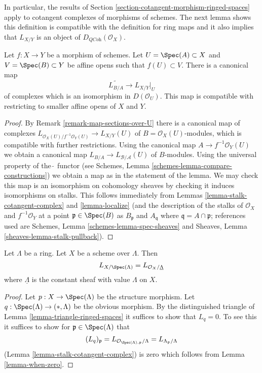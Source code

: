 \noindent
In particular, the results of
Section \ref{section-cotangent-morphism-ringed-spaces} apply
to cotangent complexes of morphisms of schemes.
The next lemma shows this definition is compatible with the definition
for ring maps and it also implies that $L_{X/Y}$ is an
object of $D_{\textit{QCoh}}(\mathcal{O}_X)$.

\begin{lemma}
\label{lemma-morphism-affine-schemes}
Let $f : X \to Y$ be a morphism of schemes. Let $U = \Spec(A) \subset X$
and $V = \Spec(B) \subset Y$ be affine opens such that $f(U) \subset V$.
There is a canonical map
$$
\widetilde{L_{B/A}} \longrightarrow L_{X/Y}|_U
$$
of complexes which is an isomorphism in $D(\mathcal{O}_U)$.
This map is compatible with restricting to smaller affine opens
of $X$ and $Y$.
\end{lemma}

\begin{proof}
By Remark \ref{remark-map-sections-over-U}
there is a canonical map of complexes
$L_{\mathcal{O}_X(U)/f^{-1}\mathcal{O}_Y(U)} \to L_{X/Y}(U)$
of $B = \mathcal{O}_X(U)$-modules, which is compatible
with further restrictions. Using the canonical map
$A \to f^{-1}\mathcal{O}_Y(U)$ we obtain a canonical map
$L_{B/A} \to L_{\mathcal{B}/\mathcal{A}}(U)$
of $B$-modules. Using the universal property of the $\widetilde{\ }$
functor (see Schemes, Lemma \ref{schemes-lemma-compare-constructions})
we obtain a map as in the statement of the lemma.
We may check this map is an isomorphism on cohomology sheaves
by checking it induces isomorphisms on stalks.
This follows immediately from
Lemmas \ref{lemma-stalk-cotangent-complex} and \ref{lemma-localize}
(and the description of the stalks of
$\mathcal{O}_X$ and $f^{-1}\mathcal{O}_Y$
at a point $\mathfrak p \in \Spec(B)$ as $B_\mathfrak p$ and
$A_\mathfrak q$ where $\mathfrak q = A \cap \mathfrak p$; references
used are Schemes, Lemma \ref{schemes-lemma-spec-sheaves}
and
Sheaves, Lemma \ref{sheaves-lemma-stalk-pullback}).
\end{proof}

\begin{lemma}
\label{lemma-scheme-over-ring}
Let $\Lambda$ be a ring. Let $X$ be a scheme over $\Lambda$.
Then
$$
L_{X/\Spec(\Lambda)} = L_{\mathcal{O}_X/\underline{\Lambda}}
$$
where $\underline{\Lambda}$ is the constant sheaf with value
$\Lambda$ on $X$.
\end{lemma}

\begin{proof}
Let $p : X \to \Spec(\Lambda)$ be the structure morphism.
Let $q : \Spec(\Lambda) \to (*, \Lambda)$ be the obvious morphism.
By the distinguished triangle of Lemma \ref{lemma-triangle-ringed-spaces}
it suffices to show that $L_q = 0$. To see this it suffices to
show for $\mathfrak p \in \Spec(\Lambda)$ that
$$
(L_q)_\mathfrak p =
L_{\mathcal{O}_{\Spec(\Lambda), \mathfrak p}/\Lambda} =
L_{\Lambda_\mathfrak p/\Lambda}
$$
(Lemma \ref{lemma-stalk-cotangent-complex})
is zero which follows from Lemma \ref{lemma-when-zero}.
\end{proof}






